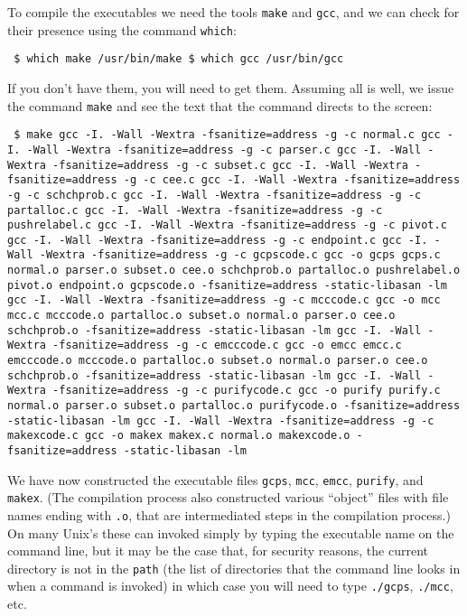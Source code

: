 \documentclass[12pt]{article}
\theoremstyle{definition}
\begin{document}
To compile the executables we need the tools \texttt{make} and
\texttt{gcc}, and we can check for their presence using
the command \texttt{which}:
\begin{obeylines}
  \texttt{
    \$ which make
    /usr/bin/make
    \$ which gcc
    /usr/bin/gcc
    }
\end{obeylines}
\bigskip \noindent If you don't have them, you will need to get them.
Assuming all is well, we issue the command \texttt{make} and see the
text that the command directs to the screen:
\begin{obeylines}
  \texttt{
    \$ make
gcc -I. -Wall -Wextra -fsanitize=address -g -c normal.c 
gcc -I. -Wall -Wextra -fsanitize=address -g -c parser.c
gcc -I. -Wall -Wextra -fsanitize=address -g -c subset.c
gcc -I. -Wall -Wextra -fsanitize=address -g -c cee.c
gcc -I. -Wall -Wextra -fsanitize=address -g -c schchprob.c
gcc -I. -Wall -Wextra -fsanitize=address -g -c partalloc.c
gcc -I. -Wall -Wextra -fsanitize=address -g -c pushrelabel.c
gcc -I. -Wall -Wextra -fsanitize=address -g -c pivot.c 
gcc -I. -Wall -Wextra -fsanitize=address -g -c endpoint.c
gcc -I. -Wall -Wextra -fsanitize=address -g -c gcpscode.c
gcc -o gcps gcps.c normal.o parser.o subset.o cee.o schchprob.o partalloc.o pushrelabel.o pivot.o endpoint.o gcpscode.o -fsanitize=address -static-libasan -lm
gcc -I. -Wall -Wextra -fsanitize=address -g -c mcccode.c
gcc -o mcc mcc.c mcccode.o partalloc.o subset.o normal.o parser.o cee.o schchprob.o  -fsanitize=address -static-libasan -lm
gcc -I. -Wall -Wextra -fsanitize=address -g -c emcccode.c
gcc -o emcc emcc.c emcccode.o mcccode.o partalloc.o subset.o normal.o parser.o cee.o schchprob.o  -fsanitize=address -static-libasan -lm
gcc -I. -Wall -Wextra -fsanitize=address -g -c purifycode.c
gcc -o purify purify.c normal.o parser.o subset.o partalloc.o purifycode.o -fsanitize=address -static-libasan -lm
gcc -I. -Wall -Wextra -fsanitize=address -g -c makexcode.c
gcc -o makex makex.c normal.o makexcode.o -fsanitize=address -static-libasan -lm
    } 
\end{obeylines}
\bigskip

We have now constructed the executable files \texttt{gcps},
\texttt{mcc}, \texttt{emcc}, \texttt{purify}, and \texttt{makex}.
(The compilation process also constructed various ``object'' files
with file names ending with \texttt{.o}, that are intermediated steps
in the compilation process.)  On many Unix's
these can invoked simply by typing the executable name on the command
line, but it may be the case that, for security reasons, the current
directory is not in the \texttt{path} (the list of directories that
the command line looks in when a command is invoked) in which case you
will need to type \texttt{./gcps}, \texttt{./mcc}, etc.
\end{document}
